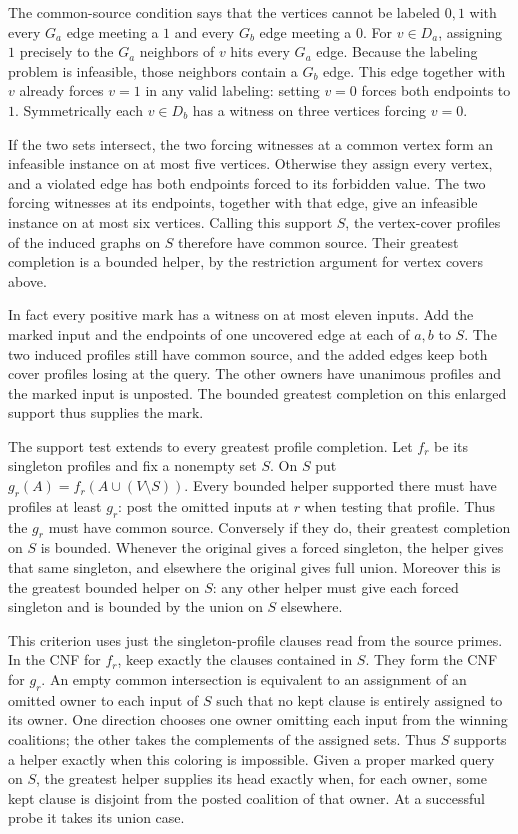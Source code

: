 The common-source condition says that the vertices
cannot be labeled $0,1$ with every $G_a$ edge meeting
a $1$ and every $G_b$ edge meeting a $0$. For
$v\in D_a$, assigning $1$ precisely to the $G_a$
neighbors of $v$ hits every $G_a$ edge. Because the
labeling problem is infeasible, those neighbors
contain a $G_b$ edge. This edge together with $v$
already forces $v=1$ in any valid labeling: setting
$v=0$ forces both endpoints to $1$. Symmetrically
each $v\in D_b$ has a witness on three vertices
forcing $v=0$.

If the two sets intersect, the two forcing witnesses
at a common vertex form an infeasible instance on at
most five vertices. Otherwise they assign every
vertex, and a violated edge has both endpoints forced
to its forbidden value. The two forcing witnesses at
its endpoints, together with that edge, give an
infeasible instance on at most six vertices. Calling
this support $S$, the vertex-cover profiles of the
induced graphs on $S$ therefore have common source.
Their greatest completion is a bounded helper, by the
restriction argument for vertex covers above.

In fact every positive mark has a witness on at most
eleven inputs. Add the marked input and the endpoints
of one uncovered edge at each of $a,b$ to $S$.
The two induced profiles still have common source,
and the added edges keep both cover profiles losing
at the query. The other owners have unanimous
profiles and the marked input is unposted. The bounded
greatest completion on this enlarged support thus
supplies the mark.

The support test extends to every greatest profile completion.
Let $f_r$ be its singleton profiles and fix a nonempty set $S$.
On $S$ put $g_r(A)=f_r(A\cup(V\setminus S))$. Every bounded
helper supported there must have profiles at least $g_r$:
post the omitted inputs at $r$ when testing that profile.
Thus the $g_r$ must have common source. Conversely if they
do, their greatest completion on $S$ is bounded. Whenever
the original gives a forced singleton, the helper gives that
same singleton, and elsewhere the original gives full union.
Moreover this is the greatest bounded helper on $S$: any
other helper must give each forced singleton and is bounded
by the union on $S$ elsewhere.

This criterion uses just the singleton-profile clauses read
from the source primes. In the CNF for $f_r$, keep exactly the
clauses contained in $S$. They form the CNF for $g_r$. An
empty common intersection is equivalent to an assignment
of an omitted owner to each input of $S$ such that no kept
clause is entirely assigned to its owner. One direction
chooses one owner omitting each input from the winning
coalitions; the other takes the complements of the assigned
sets. Thus $S$ supports a helper exactly when this coloring
is impossible. Given a proper marked query on $S$, the
greatest helper supplies its head exactly when, for each
owner, some kept clause is disjoint from the posted coalition
of that owner. At a successful probe it takes its union case.


